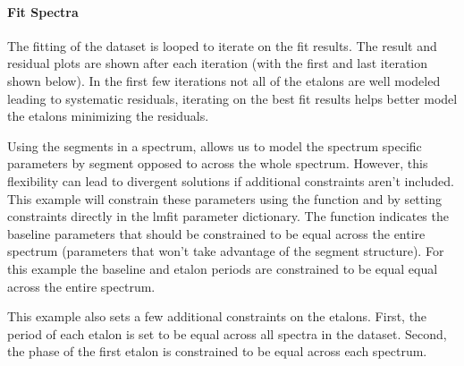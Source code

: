 \documentclass[letterpaper,10pt,english]{sphinxmanual}
\let\sphinxpxdimen\pdfpxdimen\else\newdimen\sphinxpxdimen
\begin{document}
\noindent\sphinxincludegraphics[width=762\sphinxpxdimen,height=785\sphinxpxdimen]{{ASCENDS_baselineparameters}.png}


\paragraph{Fit Spectra}
\label{\detokenize{Analysis of ASCENDS Line Spectra:fit-spectra}}
\sphinxAtStartPar
The fitting of the dataset is looped to iterate on the fit results.  The result and residual plots are shown after each iteration (with the first and last iteration shown below).  In the first few iterations not all of the etalons are well modeled leading to systematic residuals, iterating on the best fit results helps better model the etalons minimizing the residuals.

\sphinxAtStartPar
Using the segments in a spectrum, allows us to model the spectrum specific parameters by segment opposed to across the whole spectrum.  However, this flexibility can lead to divergent solutions if additional constraints aren’t included.  This example will constrain these parameters using the {\hyperref[\detokenize{MATS:MATS.fit_dataset.Fit_DataSet.constrained_baseline}]{}} function and by setting constraints directly in the lmfit parameter dictionary.  The {\hyperref[\detokenize{MATS:MATS.fit_dataset.Fit_DataSet.constrained_baseline}]{}} function indicates the baseline parameters that should be constrained to be equal across the entire spectrum (parameters that won’t take advantage of the segment structure).  For this example the baseline and etalon periods are constrained to be equal equal across the entire spectrum.

\sphinxAtStartPar
This example also sets a few additional constraints on the etalons.  First, the period of each etalon is set to be equal across all spectra in the dataset.  Second, the phase of the first etalon is constrained to be equal across each spectrum.
\end{document}
